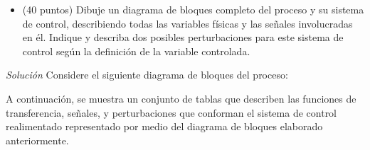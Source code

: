 \begin{itemize}
    \item (40 puntos) Dibuje un diagrama de bloques completo del proceso y su sistema de control, describiendo todas las variables físicas y las señales involucradas en él. 
        Indique y describa dos posibles perturbaciones para este sistema de control según la definición de la variable controlada.
\end{itemize}

\pagebreak

\textit{Solución}
Considere el siguiente diagrama de bloques del proceso:



A continuación, se muestra un conjunto de tablas que describen las funciones de transferencia, señales, y perturbaciones que conforman el sistema de control realimentado representado por medio del diagrama de bloques elaborado anteriormente.


\pagebreak

\pagebreak

\pagebreak

